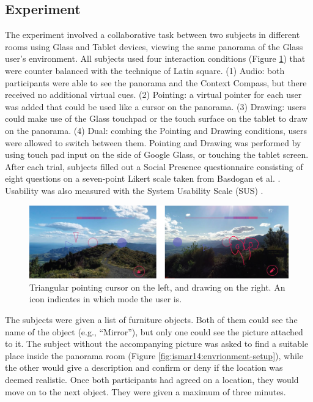 \subsection{Experiment}

The experiment involved a collaborative task between two subjects in different rooms using Glass and Tablet devices, viewing the same panorama of the Glass user's environment. All subjects used four interaction conditions (Figure \ref{fig:ismar14:pointing-drawing}) that were counter balanced with the technique of Latin square.
(1) Audio: both participants were able to see the panorama and the Context Compass, but there received no additional virtual cues. 
(2) Pointing: a virtual pointer for each user was added that could be used like a cursor on the panorama.
(3) Drawing: users could make use of the Glass touchpad or the touch surface on the tablet to draw on the panorama. 
(4) Dual: combing the Pointing and Drawing conditions, users were allowed to switch between them.
Pointing and Drawing was performed by using touch pad input on the side of Google Glass, or touching the tablet screen. After each trial, subjects filled out a Social Presence questionnaire consisting of eight questions on a seven-point Likert scale taken from Basdogan et al. \cite{Basdogan2001}. Usability was also measured with the System Usability Scale (SUS) \cite{brooke1996sus}.

\begin{figure}[ht]
	\centering
	\includegraphics[width=\linewidth]{images/ismar14/pointing-drawing}
	\caption{Triangular pointing cursor on the left, and drawing on the right. An icon indicates in which mode the user is.}
	\label{fig:ismar14:pointing-drawing}
\end{figure}

The subjects were given a list of furniture objects. Both of them could see the name of the object (e.g., “Mirror”), but only one could see the picture attached to it. The subject without the accompanying picture was asked to find a suitable place inside the panorama room (Figure \ref{fig:ismar14:envrionment-setup}), while the other would give a description and confirm or deny if the location was deemed realistic. Once both participants had agreed on a location, they would move on to the next object. They were given a maximum of three minutes.

